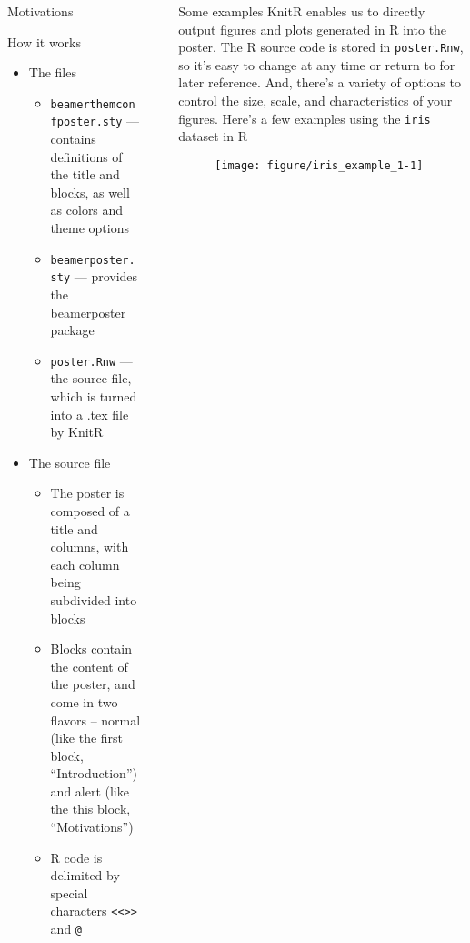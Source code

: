 \documentclass[capfont, final]{beamer}\usepackage[]{graphicx}\usepackage[]{color}
\newenvironment{knitrout}{}{} %
\newlength{\sepwid}
\newlength{\onecolwid}
\newlength{\twocolwid}
\begin{document}
\begin{frame}[t, fragile]
\begin{columns}[T]
\begin{column}{\onecolwid}
\begin{alertblock}{Motivations}
\begin{itemize}
\begin{itemize}
								\end{itemize}
						\end{itemize}
				\end{alertblock}
				\begin{block}{How it works}
						\begin{itemize}
							\item The files
								\begin{itemize}
									\item \texttt{beamerthemconfposter.sty} --- contains definitions of the title and blocks, as well as colors and theme options
									\item \texttt{beamerposter.sty} --- provides the beamerposter package
									\item \texttt{poster.Rnw} --- the source file, which is turned into a .tex file by KnitR
								\end{itemize}
							\item The source file
								\begin{itemize}
							\item The poster is composed of a title and columns, with each column being subdivided into blocks
							\item Blocks contain the content of the poster, and come in two flavors -- normal (like the first block, ``Introduction'') and alert (like the this block, ``Motivations'')
							\item R code is delimited by special characters \texttt{<<>>} and \texttt{@}
								\end{itemize}
						\end{itemize}
				\end{block}
		\end{column} %
		\begin{column}{\sepwid}\end{column} %
		\begin{column}{\twocolwid} %
				\begin{block}{Some examples}
					KnitR enables us to directly output figures and plots generated in R into the poster. The R source code is stored in \texttt{poster.Rnw}, so it's easy to change at any time or return to for later reference. And, there's a variety of options to control the size, scale, and characteristics of your figures. Here's a few examples using the \texttt{iris} dataset in R

\begin{figure}
\begin{knitrout}\small
{}\color{fgcolor}
\texttt{[image: figure/iris\_example\_1-1]} 


\end{knitrout}
\end{figure}
\end{block}
\end{column}
\end{columns}
\end{frame}
\end{document}
